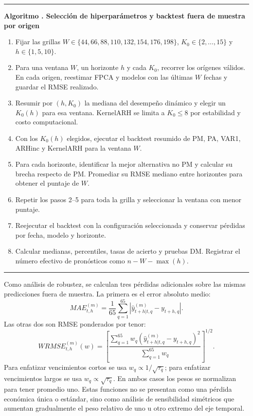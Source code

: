 \documentclass[a4paper,11pt]{article}
\newcounter{algoritmotesis}
\newenvironment{algoritmotesis}[1]{%
  \refstepcounter{algoritmotesis}%
  \par\medskip
  \noindent\begin{minipage}{\linewidth}
  \hrule\vspace{0.6em}
  \textbf{Algoritmo \thealgoritmotesis. #1}
  \begin{enumerate}
}{%
  \end{enumerate}
  \vspace{0.2em}\hrule
  \end{minipage}
  \par\medskip
}
\begin{document}
\begin{algoritmotesis}{Selección de hiperparámetros y backtest fuera de muestra por origen}
  \item Fijar las grillas \(W\in\{44,66,88,110,132,154,176,198\}\), \(K_0\in\{2,\ldots,15\}\) y \(h\in\{1,5,10\}\).
  \item Para una ventana \(W\), un horizonte \(h\) y cada \(K_0\), recorrer los orígenes válidos. En cada origen, reestimar FPCA y modelos con las últimas \(W\) fechas y guardar el RMSE realizado.
  \item Resumir por \((h,K_0)\) la mediana del desempeño dinámico y elegir un \(K_0(h)\) para esa ventana. KernelARH se limita a \(K_0\leq 8\) por estabilidad y costo computacional.
  \item Con los \(K_0(h)\) elegidos, ejecutar el backtest resumido de PM, PA, VAR1, ARHinc y KernelARH para la ventana \(W\).
  \item Para cada horizonte, identificar la mejor alternativa no PM y calcular su brecha respecto de PM. Promediar su RMSE mediano entre horizontes para obtener el puntaje de \(W\).
  \item Repetir los pasos 2--5 para toda la grilla y seleccionar la ventana con menor puntaje.
  \item Reejecutar el backtest con la configuración seleccionada y conservar pérdidas por fecha, modelo y horizonte.
  \item Calcular medianas, percentiles, tasas de acierto y pruebas DM. Registrar el número efectivo de pronósticos como \(n-W-\max(h)\).
\end{algoritmotesis}

Como análisis de robustez, se calculan tres pérdidas adicionales sobre las mismas predicciones fuera de muestra. La primera es el error absoluto medio:
\[
  MAE_{t,h}^{(m)}
  =
  \frac{1}{65}\sum_{q=1}^{65}
  \left|
  \widehat y_{t+h|t,q}^{(m)}-y_{t+h,q}
  \right|.
\]
Las otras dos son RMSE ponderados por tenor:
\[
  WRMSE_{t,h}^{(m)}(w)
  =
  \left[
  \frac{\sum_{q=1}^{65}w_q
  \left(
  \widehat y_{t+h|t,q}^{(m)}-y_{t+h,q}
  \right)^2}{\sum_{q=1}^{65}w_q}
  \right]^{1/2}.
\]
Para enfatizar vencimientos cortos se usa \(w_q\propto 1/\sqrt{\tau_q}\); para enfatizar vencimientos largos se usa \(w_q\propto \sqrt{\tau_q}\). En ambos casos los pesos se normalizan para tener promedio uno. Estas funciones no se presentan como una pérdida económica única o estándar, sino como análisis de sensibilidad simétricos que aumentan gradualmente el peso relativo de uno u otro extremo del eje temporal.
\end{document}
